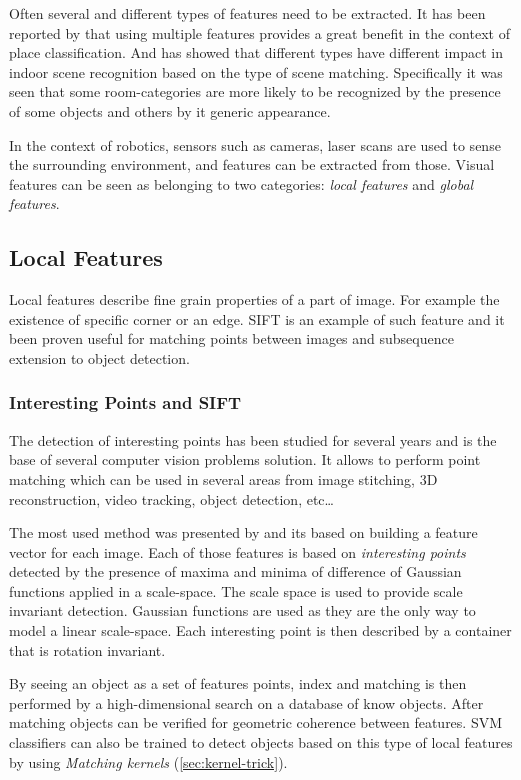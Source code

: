 Often several and different types of features need to be extracted. It has been
reported by \cite{pronobis2010ijrr} that using multiple features provides a
great benefit in the context of place classification.
And \cite{quattoni2009recognizing} has showed that different types have
different impact in indoor scene recognition based on the type of scene
matching. Specifically it was seen that some room-categories are more likely to be
recognized by the presence of some objects and others by it generic appearance.

In the context of robotics, sensors such as cameras, laser scans are used to
sense the surrounding environment, and features can be extracted from those.
Visual features can be seen as belonging to two categories:
\emph{local features} and \emph{global features}.


\subsection{Local Features}
\label{sec:local-features}
Local features describe fine grain properties of a part of image.
For example the existence of specific corner or an edge. \Gls{SIFT}
is an example of such feature and it been proven useful
for matching points between images and subsequence extension to object detection.

\subsubsection*{Interesting Points and SIFT}
\label{sec:sift}
The detection of interesting points has been studied for several years and is
the base of several computer vision problems solution. It allows to perform
point matching which can be used in several areas from image stitching,
3D reconstruction, video tracking, object detection, etc\dots

The most used method was presented by \cite{lowe1999object} and its based on
building a feature vector for each image. Each of those features is based on
\emph{interesting points} detected by the presence of maxima and minima of
difference of Gaussian functions applied in a scale-space.
The scale space is used to provide scale invariant detection. Gaussian functions
are used as they are the only way to model a linear scale-space.
Each interesting point is then described by a container that is rotation
invariant.

By seeing an object as a set of features points, index and matching is then
performed by a high-dimensional search on a database of know objects. After
matching objects can be verified for geometric coherence between features.
\Gls{SVM} classifiers can also be trained to detect objects based on this type
of local features by using \emph{Matching kernels} (\autoref{sec:kernel-trick}).

